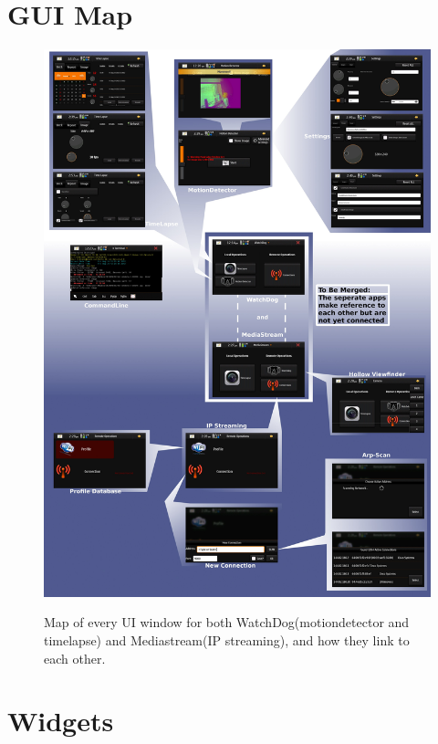 \section{GUI Map}\label{guimap}
\begin{figure}[H]
	\vspace{-20pt}
	\begin{center}
		\includegraphics[width=1.1\textwidth]{../images/map}
		\label{img:map}
	\end{center}
	\vspace{-30pt}
	\caption{Map of every UI window for both WatchDog(motiondetector and timelapse) and Mediastream(IP streaming), and how they link to each other.}
\end{figure}

\section{Widgets}

